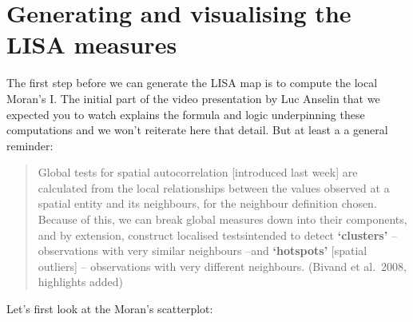 \documentclass[]{book}
\newenvironment{Shaded}{\begin{snugshade}}{\end{snugshade}}
\newcommand{\CommentTok}[1]{\textcolor[rgb]{0.56,0.35,0.01}{\textit{#1}}}
\newcommand{\DataTypeTok}[1]{\textcolor[rgb]{0.13,0.29,0.53}{#1}}
\newcommand{\KeywordTok}[1]{\textcolor[rgb]{0.13,0.29,0.53}{\textbf{#1}}}
\newcommand{\NormalTok}[1]{#1}
\newcommand{\OperatorTok}[1]{\textcolor[rgb]{0.81,0.36,0.00}{\textbf{#1}}}
\newcommand{\StringTok}[1]{\textcolor[rgb]{0.31,0.60,0.02}{#1}}
\begin{document}
\begin{Shaded}
\end{Shaded}

\hypertarget{generating-and-visualising-the-lisa-measures}{%
\section{Generating and visualising the LISA measures}\label{generating-and-visualising-the-lisa-measures}}

The first step before we can generate the LISA map is to compute the local Moran's I. The initial part of the video presentation by Luc Anselin that we expected you to watch explains the formula and logic underpinning these computations and we won't reiterate here that detail. But at least a a general reminder:

\begin{quote}
Global tests for spatial autocorrelation {[}introduced last week{]} are calculated from the local relationships between the values observed at a spatial entity and its neighbours, for the neighbour definition chosen. Because of this, we can break global measures down into their components, and by extension, construct localised testsintended to detect \textbf{`clusters'} -- observations with very similar neighbours --and \textbf{`hotspots'} {[}spatial outliers{]} -- observations with very different neighbours.
(Bivand et al.~2008, highlights added)
\end{quote}

Let's first look at the Moran's scatterplot:

\begin{Shaded}
\end{Shaded}
\end{document}
